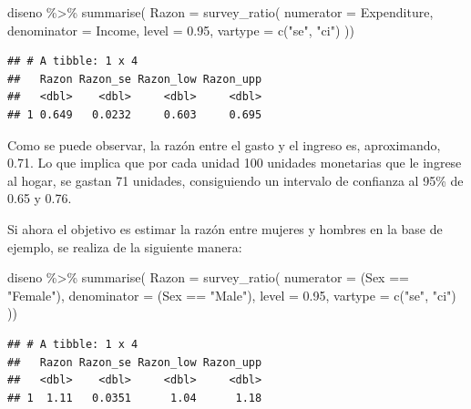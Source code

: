 \documentclass[
  12pt,
]{book}
\newenvironment{Shaded}{\begin{snugshade}}{\end{snugshade}}
\newcommand{\AttributeTok}[1]{\textcolor[rgb]{0.77,0.63,0.00}{#1}}
\newcommand{\FloatTok}[1]{\textcolor[rgb]{0.00,0.00,0.81}{#1}}
\newcommand{\FunctionTok}[1]{\textcolor[rgb]{0.00,0.00,0.00}{#1}}
\newcommand{\NormalTok}[1]{#1}
\newcommand{\SpecialCharTok}[1]{\textcolor[rgb]{0.00,0.00,0.00}{#1}}
\newcommand{\StringTok}[1]{\textcolor[rgb]{0.31,0.60,0.02}{#1}}
\begin{document}
\begin{Shaded}
\begin{Highlighting}[]
\NormalTok{diseno }\SpecialCharTok{\%\textgreater{}\%} \FunctionTok{summarise}\NormalTok{(}
    \AttributeTok{Razon =}  \FunctionTok{survey\_ratio}\NormalTok{(}
      \AttributeTok{numerator =}\NormalTok{ Expenditure,}
      \AttributeTok{denominator =}\NormalTok{ Income,}
      \AttributeTok{level =} \FloatTok{0.95}\NormalTok{,}
    \AttributeTok{vartype =}  \FunctionTok{c}\NormalTok{(}\StringTok{"se"}\NormalTok{, }\StringTok{"ci"}\NormalTok{)}
\NormalTok{    ))}
\end{Highlighting}
\end{Shaded}

\begin{verbatim}
## # A tibble: 1 x 4
##   Razon Razon_se Razon_low Razon_upp
##   <dbl>    <dbl>     <dbl>     <dbl>
## 1 0.649   0.0232     0.603     0.695
\end{verbatim}

Como se puede observar, la razón entre el gasto y el ingreso es, aproximando, 0.71. Lo que implica que por cada unidad 100 unidades monetarias que le ingrese al hogar, se gastan 71 unidades, consiguiendo un intervalo de confianza al 95\% de 0.65 y 0.76.

Si ahora el objetivo es estimar la razón entre mujeres y hombres en la base de ejemplo, se realiza de la siguiente manera:

\begin{Shaded}
\begin{Highlighting}[]
\NormalTok{diseno }\SpecialCharTok{\%\textgreater{}\%} \FunctionTok{summarise}\NormalTok{(}
    \AttributeTok{Razon =}  \FunctionTok{survey\_ratio}\NormalTok{(}
      \AttributeTok{numerator =}\NormalTok{ (Sex }\SpecialCharTok{==} \StringTok{"Female"}\NormalTok{),}
      \AttributeTok{denominator =}\NormalTok{ (Sex }\SpecialCharTok{==} \StringTok{"Male"}\NormalTok{),}
      \AttributeTok{level =} \FloatTok{0.95}\NormalTok{,}
    \AttributeTok{vartype =}  \FunctionTok{c}\NormalTok{(}\StringTok{"se"}\NormalTok{, }\StringTok{"ci"}\NormalTok{)}
\NormalTok{    ))}
\end{Highlighting}
\end{Shaded}

\begin{verbatim}
## # A tibble: 1 x 4
##   Razon Razon_se Razon_low Razon_upp
##   <dbl>    <dbl>     <dbl>     <dbl>
## 1  1.11   0.0351      1.04      1.18
\end{verbatim}
\end{document}

